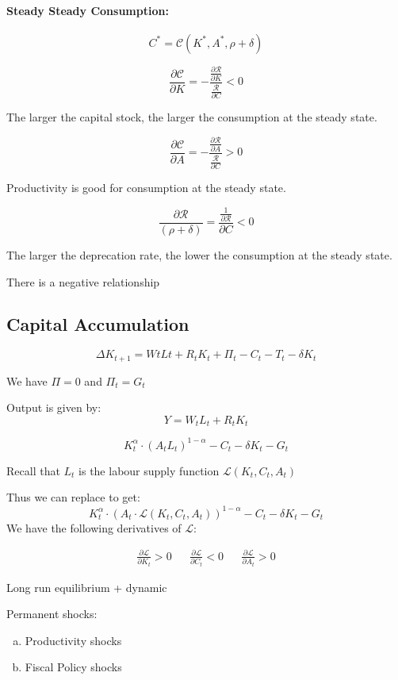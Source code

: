 \paragraph{Steady Steady Consumption:}

$$
C^* = \mathcal{C} \left( K^*, A^*, \rho + \delta \right)
$$

$$
\frac{\partial \mathcal{C}}{\partial K} = - \frac{\frac{\partial \mathcal{R}}{\partial K}}{\frac{\mathcal{R}}{\partial C}} < 0
$$

The larger the capital stock, the larger the consumption at the steady state. 


$$
\frac{\partial \mathcal{C}}{\partial A} = - \frac{\frac{\partial \mathcal{R}}{\partial A}}{\frac{\mathcal{R}}{\partial C}} > 0
$$

Productivity is good for consumption at the steady state. 



$$
\frac{\partial \mathcal{R}}{(\rho + \delta)} = \frac{\frac{1}{\partial \mathcal{R}}}{\partial C} < 0
$$

The larger the deprecation rate, the lower the consumption at the steady state. 

There is a negative relationship

\subsection{Capital Accumulation}

$$
\Delta K_{t + 1} = WtLt + R_t K_t + \Pi_t - C_t - T_t - \delta K_t
$$

We have $\Pi = 0$ and $\Pi_t = G_t$


Output is given by: 
$$
Y = W_t L_t + R_t K_t
$$

$$
K_t^{\alpha} \cdot \left( A_t L_t \right)^{1 - \alpha} - C_t - \delta K_t - G_t
$$

Recall that $L_t$ is the labour supply function $\mathcal{L}(K_t, C_t, A_t)$

Thus we can replace to get:
$$
K_t^{\alpha} \cdot \left( A_t \cdot \mathcal{L}(K_t, C_t, A_t) \right)^{1 - \alpha} - C_t - \delta K_t - G_t
$$
We have the following derivatives of $\mathcal{L}$:

\begin{align*}
    \frac{\partial \mathcal{L} }{\partial K_t} > 0 && \frac{\partial \mathcal{L}}{\partial C_t} < 0 && \frac{\partial \mathcal{L} }{\partial A_t} > 0
\end{align*}

Long run equilibrium + dynamic

Permanent shocks:
\begin{enumerate}[a)]
    \item Productivity shocks
    \item Fiscal Policy shocks
\end{enumerate}
